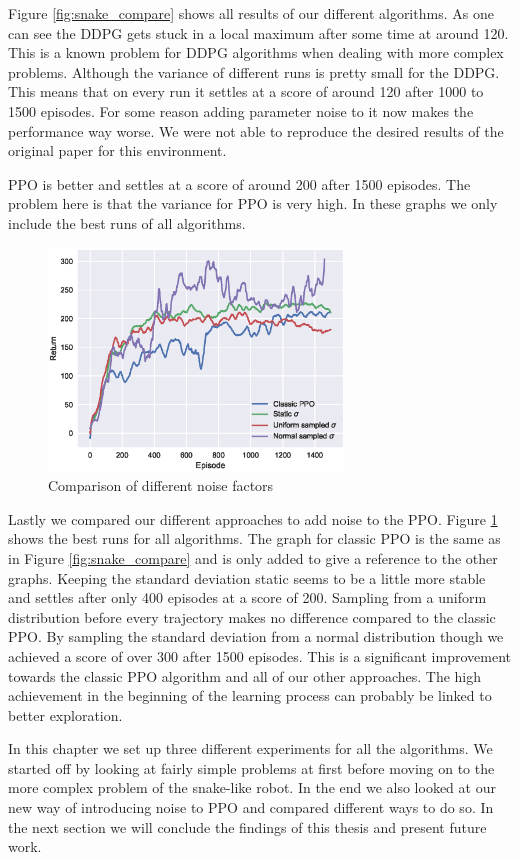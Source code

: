 Figure \ref{fig:snake_compare} shows all results of our different algorithms.
As one can see the DDPG gets stuck in a local maximum after some time at around 120. This is a known problem
for DDPG algorithms when dealing with more complex problems. Although the variance
of different runs is pretty small for the DDPG. This means that on every run it settles at a
score of around 120 after 1000 to 1500 episodes. For some reason adding parameter noise
to it now makes the performance way worse. We were not able to reproduce the desired
results of the original paper for this environment.


PPO is better and settles at a score of around 200 after 1500 episodes. The problem here
is that the variance for PPO is very high. In these graphs we only include the best runs of
all algorithms.

\newpage

\begin{figure}[H]
\centerline{
\includegraphics[width=0.7\textwidth]{images/ppo_compare_noise.eps}}
\caption{Comparison of different noise factors}
\label{fig:ppo_noise_compare}
\end{figure}

Lastly we compared our different approaches to add noise to the PPO.
Figure \ref{fig:ppo_noise_compare} shows the best runs for all algorithms.
The graph for classic PPO is the same as in Figure \ref{fig:snake_compare} and is only added to give a reference to the other graphs.
Keeping the standard deviation static seems to be a little more stable and settles after only 400 episodes at a score of 200.
Sampling from a uniform distribution before every trajectory makes no difference compared to the classic PPO.
By sampling the standard deviation from a normal distribution though we achieved a score of over 300 after 1500 episodes.
This is a significant improvement towards the classic PPO algorithm and all of our other approaches.
The high achievement in the beginning of the learning process can probably be linked to better exploration.


In this chapter we set up three different experiments for all the algorithms.
We started off by looking at fairly simple problems at first before moving on to the more complex problem of the snake-like robot.
In the end we also looked at our new way of introducing noise to PPO and compared different ways to do so.
In the next section we will conclude the findings of this thesis and present future work.
